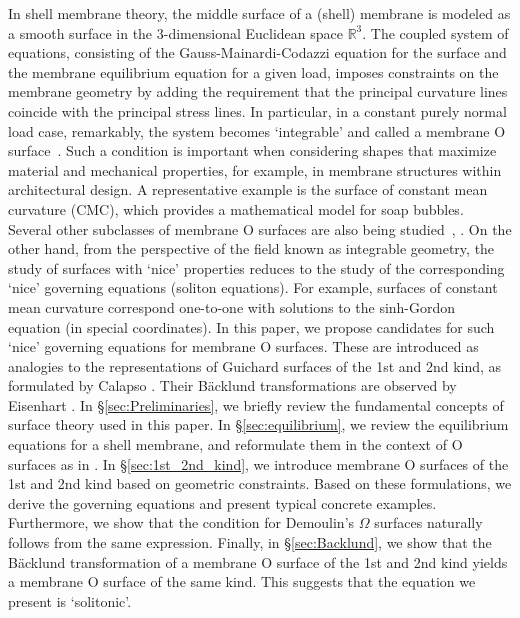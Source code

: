 \documentclass[a4paper]{amsart}
\def\R{\mathbb{R}}
\theoremstyle{definition}
\begin{document}
In shell membrane theory, the middle surface of a (shell) membrane is modeled as a smooth surface in the $3$-dimensional Euclidean space $\R^3$.
The coupled system of equations, consisting of the Gauss-Mainardi-Codazzi equation for the surface and the membrane equilibrium equation for a given load, imposes constraints on the membrane geometry by adding the requirement that the principal curvature lines coincide with the principal stress lines.
In particular, in a constant purely normal load case, remarkably, the system becomes `integrable' and called a membrane O surface~\cite{RogersSchief}.
Such a condition is important when considering shapes that maximize material and mechanical properties, for example, in membrane structures within architectural design.
A representative example is the surface of constant mean curvature (CMC), which provides a mathematical model for soap bubbles. 
Several other subclasses of membrane O surfaces are also being studied~\cite{RSSLame}, \cite{RSSEnneper}.
On the other hand, from the perspective of the field known as integrable geometry, the study of surfaces with `nice' properties reduces to the study of the corresponding `nice' governing equations (soliton equations).
For example, surfaces of constant mean curvature correspond one-to-one with solutions to the sinh-Gordon equation (in special coordinates).
In this paper, we propose candidates for such `nice' governing equations for membrane O surfaces.
These are introduced as analogies to the representations of Guichard surfaces of the 1st and 2nd kind, as formulated by Calapso \cite{Calapso}.
Their B\"acklund transformations are observed by Eisenhart \cite{Eisenhart_Omega2}.
In \S \ref{sec:Preliminaries}, we briefly review the fundamental concepts of surface theory used in this paper.
In \S \ref{sec:equilibrium}, we review the equilibrium equations for a shell membrane, and reformulate them in the context of O surfaces as in \cite{RogersSchief}.
In \S \ref{sec:1st_2nd_kind}, we introduce membrane O surfaces of the 1st and 2nd kind based on geometric constraints.
Based on these formulations, we derive the governing equations and present typical concrete examples.
Furthermore, we show that the condition for Demoulin's $\Omega$ surfaces naturally follows from the same expression.
Finally, in \S \ref{sec:Backlund}, we show that the B\"acklund transformation of a membrane O surface of the 1st and 2nd kind yields a membrane O surface of the same kind.
This suggests that the equation we present is `solitonic'.

\end{document}
